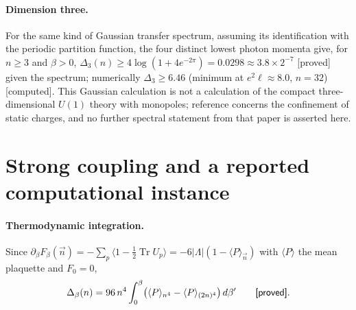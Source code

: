 \documentclass[11pt,a4paper]{article}
\theoremstyle{plain}
\theoremstyle{definition}
\theoremstyle{remark}
\numberwithin{equation}{section}
\newcommand{\Tr}{\operatorname{Tr}}
\newcommand{\st}[1]{\textsf{[#1]}}
\begin{document}
\paragraph{Dimension three.} For the same kind of Gaussian transfer spectrum, assuming its identification with the periodic partition function,
the four distinct lowest photon momenta give, for $n\ge3$ and $\beta>0$, $\Delta_3(n)\ge4\log(1+4e^{-2\pi})=0.0298\approx3.8\times2^{-7}$ \st{proved}
given the spectrum; numerically $\Delta_3\ge6.46$ (minimum at $e^2\ell\approx8.0$, $n=32$) \st{computed}. This Gaussian calculation is not a
calculation of the compact three-dimensional $U(1)$ theory with monopoles; reference \cite{GM82} concerns the confinement of static charges, and
no further spectral statement from that paper is asserted here.

\section{Strong coupling and a reported computational instance}\label{sec:strong}

\paragraph{Thermodynamic integration.} Since $\partial_\beta F_\beta(\vec n)=-\sum_p\langle1-\frac12\Tr U_p\rangle=-6|\Lambda|(1-\langle
P\rangle_{\vec n})$ with $\langle P\rangle$ the mean plaquette and $F_0=0$,
\begin{equation}\label{eq:thermo}
\Delta_\beta(n)=96\,n^4\int_0^\beta\bigl(\langle P\rangle_{n^4}-\langle P\rangle_{(2n)^4}\bigr)\,d\beta'\qquad\text{\st{proved}}.
\end{equation}
\end{document}
